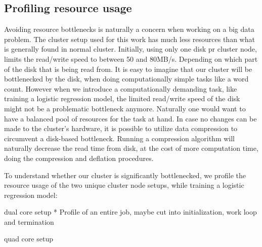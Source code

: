 \subsection{Profiling resource usage}

Avoiding resource bottlenecks is naturally a concern when working on a big data problem. The cluster setup used for this work has much less resources than what is generally found in normal cluster. Initially, using only one disk pr cluster node, limits the read/write speed to between 50 and 80MB/s. Depending on which part of the disk that is being read from. It is easy to imagine that our cluster will be bottlenecked by the disk, when doing computationally simple tasks like a word count. However when we introduce a computationally demanding task, like training a logistic regression model, the limited read/write speed of the disk might not be a problematic bottleneck anymore. Naturally one would want to have a balanced pool of resources for the task at hand. In case no changes can be made to the cluster's hardware, it is possible to utilize data compression to circumvent a disk-based bottleneck. Running a compression algorithm will naturally decrease the read time from disk, at the cost of more computation time, doing the compression and deflation procedures.

To understand whether our cluster is significantly bottlenecked, we profile the resource usage of the two unique cluster node setups, while training a logistic regression model:

dual core setup
* Profile of an entire job, maybe cut into initialization, work loop and termination

quad core setup